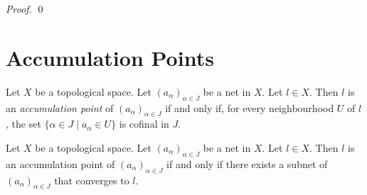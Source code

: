 \begin{proof}
    \pf
    \qed
\end{proof}

\section{Accumulation Points}

\begin{definition}
    Let $X$ be a topological space. Let $(a_\alpha)_{\alpha \in J}$ be a net
    in $X$. Let $l \in X$. Then $l$ is an \emph{accumulation point} of
    $(a_\alpha)_{\alpha \in J}$ if and only if, for every neighbourhood $U$
    of $l$, the set $\{ \alpha \in J \mid a_\alpha \in U \}$ is cofinal in $J$.
\end{definition}

\begin{lemma}
    \label{lemma:accumulation_point_subnet}
    Let $X$ be a topological space. Let $(a_\alpha)_{\alpha \in J}$ be a net
    in $X$. Let $l \in X$. Then $l$ is an accumulation point of
    $(a_\alpha)_{\alpha \in J}$ if and only if there exists a subnet of
    $(a_\alpha)_{\alpha \in J}$ that converges to $l$.
\end{lemma}

